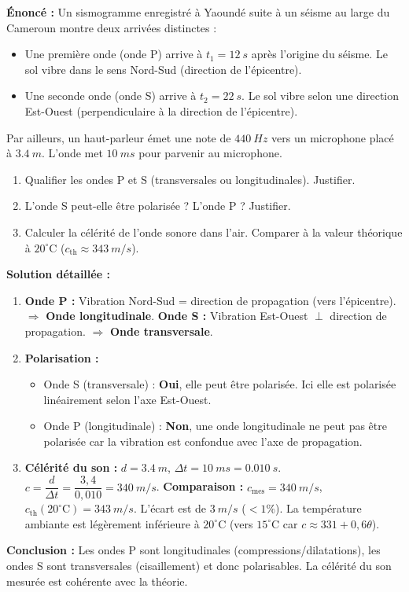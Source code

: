 \documentclass[11pt]{article}
\begin{document}
\begin{exoresolu}
\textbf{Énoncé :} Un sismogramme enregistré à Yaoundé suite à un séisme au large du Cameroun montre deux arrivées distinctes :
\begin{itemize}
    \item Une première onde (onde P) arrive à $t_1 = \SI{12}{s}$ après l'origine du séisme. Le sol vibre dans le sens Nord-Sud (direction de l'épicentre).
    \item Une seconde onde (onde S) arrive à $t_2 = \SI{22}{s}$. Le sol vibre selon une direction Est-Ouest (perpendiculaire à la direction de l'épicentre).
\end{itemize}
Par ailleurs, un haut-parleur émet une note de $\SI{440}{Hz}$ vers un microphone placé à $\SI{3,4}{m}$. L'onde met $\SI{10}{ms}$ pour parvenir au microphone.
\begin{enumerate}
    \item Qualifier les ondes P et S (transversales ou longitudinales). Justifier.
    \item L'onde S peut-elle être polarisée ? L'onde P ? Justifier.
    \item Calculer la célérité de l'onde sonore dans l'air. Comparer à la valeur théorique à $20^\circ\text{C}$ ($c_{\text{th}} \approx \SI{343}{m/s}$).
\end{enumerate}
\tcblower
\textbf{Solution détaillée :}
\begin{enumerate}
    \item \textbf{Onde P :} Vibration Nord-Sud = direction de propagation (vers l'épicentre). $\Rightarrow$ \textbf{Onde longitudinale}.
    \textbf{Onde S :} Vibration Est-Ouest $\perp$ direction de propagation. $\Rightarrow$ \textbf{Onde transversale}.
    \item \textbf{Polarisation :}
    \begin{itemize}
        \item Onde S (transversale) : \textbf{Oui}, elle peut être polarisée. Ici elle est polarisée linéairement selon l'axe Est-Ouest.
        \item Onde P (longitudinale) : \textbf{Non}, une onde longitudinale ne peut pas être polarisée car la vibration est confondue avec l'axe de propagation.
    \end{itemize}
    \item \textbf{Célérité du son :} $d = \SI{3,4}{m}$, $\Delta t = \SI{10}{ms} = \SI{0,010}{s}$.
    $c = \dfrac{d}{\Delta t} = \dfrac{3,4}{0,010} = \SI{340}{m/s}$.
    \textbf{Comparaison :} $c_{\text{mes}} = \SI{340}{m/s}$, $c_{\text{th}}(20^\circ\text{C}) = \SI{343}{m/s}$. L'écart est de $\SI{3}{m/s}$ ($< 1\%$). La température ambiante est légèrement inférieure à $20^\circ\text{C}$ (vers $15^\circ\text{C}$ car $c \approx 331 + 0,6\theta$).
\end{enumerate}
\textbf{Conclusion :} Les ondes P sont longitudinales (compressions/dilatations), les ondes S sont transversales (cisaillement) et donc polarisables. La célérité du son mesurée est cohérente avec la théorie.
\end{exoresolu}
\end{document}
